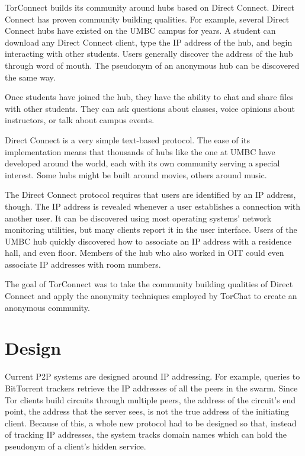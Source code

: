 \documentclass{article}
\begin{document}
TorConnect builds its community around hubs based on Direct Connect.  Direct Connect has proven community building qualities.  For example, several Direct Connect hubs have existed on the UMBC campus for years.  A student can download any Direct Connect client, type the IP address of the hub, and begin interacting with other students.  Users generally discover the address of the hub through word of mouth.  The pseudonym of an anonymous hub can be discovered the same way.

Once students have joined the hub, they have the ability to chat and share files with other students.  They can ask questions about classes, voice opinions about instructors, or talk about campus events.

Direct Connect is a very simple text-based protocol.  The ease of its implementation means that thousands of hubs like the one at UMBC have developed around the world, each with its own community serving a special interest.  Some hubs might be built around movies, others around music.

The Direct Connect protocol requires that users are identified by an IP address, though.  The IP address is revealed whenever a user establishes a connection with another user.  It can be discovered using most operating systems' network monitoring utilities, but many clients report it in the user interface.  Users of the UMBC hub quickly discovered how to associate an IP address with a residence hall, and even floor.  Members of the hub who also worked in OIT could even associate IP addresses with room numbers.

The goal of TorConnect was to take the community building qualities of Direct Connect and apply the anonymity techniques employed by TorChat to create an anonymous community.

\section{Design}
Current P2P systems are designed around IP addressing.  For example, queries to BitTorrent trackers retrieve the IP addresses of all the peers in the swarm.  Since Tor clients build circuits through multiple peers, the address of the circuit's end point, the address that the server sees, is not the true address of the initiating client.  Because of this, a whole new protocol had to be designed so that, instead of tracking IP addresses, the system tracks domain names which can hold the pseudonym of a client's hidden service.
\end{document}
